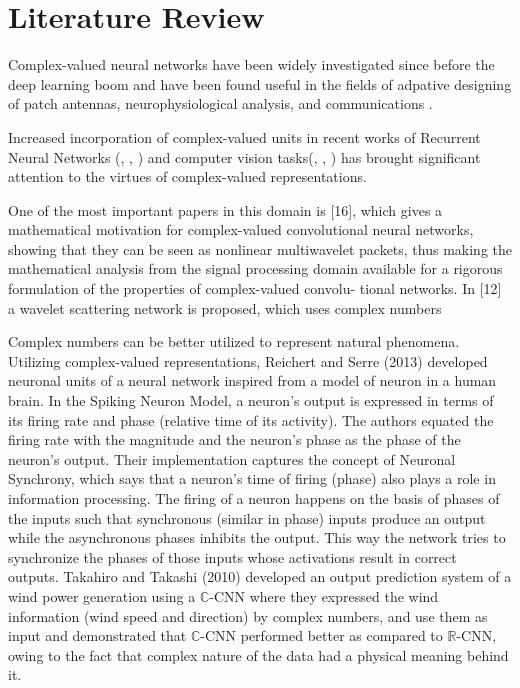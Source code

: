 \chapter{Literature Review}\label{chap:comp}

Complex-valued neural networks have been widely investigated since before the deep learning boom and have been found useful in the fields of adpative designing of patch antennas, neurophysiological analysis, and communications \cite{hirose2012complex}. 



Increased incorporation of complex-valued units in recent works of Recurrent Neural Networks (\cite{ArjovskySB15}, \cite{wisdom2016full}, \cite{danihelka2016associative}) and computer vision tasks(\cite{oyallon2015deep}, \cite{bruna2015theoretical}, \cite{worrall2017harmonic}) has brought significant attention to the virtues of complex-valued representations. 

 One of the
most important papers in this domain is [16], which gives
a mathematical motivation for complex-valued convolutional
neural networks, showing that they can be seen as nonlinear
multiwavelet packets, thus making the mathematical analysis
from the signal processing domain available for a rigorous
formulation of the properties of complex-valued convolu-
tional networks. 
 In [12] a wavelet
scattering network is proposed, which uses complex numbers

Complex numbers can be better utilized to represent natural phenomena. Utilizing complex-valued representations, Reichert and Serre (2013) \cite{reichert2013neuronal} developed neuronal units of a neural network inspired from a model of neuron in a human brain. In the Spiking Neuron Model, a neuron's output is expressed in terms of its firing rate and phase (relative time of its activity). The authors equated the firing rate with the magnitude and the neuron's phase as the phase of the neuron's output. Their implementation captures the concept of Neuronal Synchrony, which says that a neuron's time of firing (phase) also plays a role in information processing. The firing of a neuron happens on the basis of phases of the inputs such that synchronous (similar in phase) inputs produce an output while the asynchronous phases inhibits the output. This way the network tries to synchronize the phases of those inputs whose activations result in correct outputs. Takahiro and Takashi (2010) developed an output prediction system of a wind power generation using a $\mathbb{C}$-CNN where they expressed the wind information (wind speed and direction) by complex numbers, and use them as input and demonstrated that $\mathbb{C}$-CNN performed better as compared to $\mathbb{R}$-CNN, owing to the fact that complex nature of the data had a physical meaning behind it.
 
